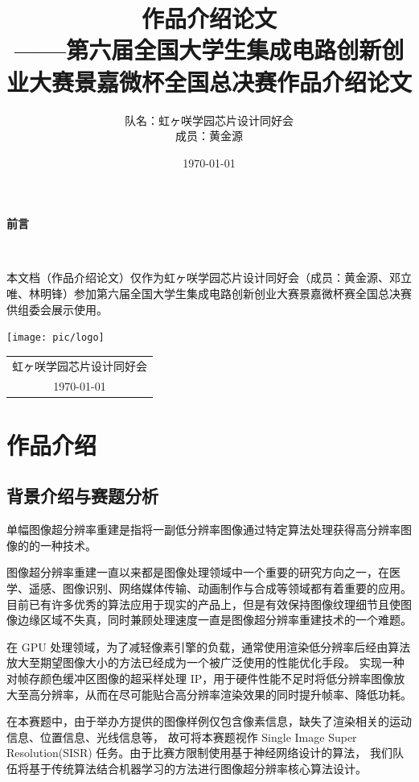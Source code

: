 \documentclass[12pt, a4paper, oneside]{ctexbook}
\title{{\Huge{\textbf{作品介绍论文}}}\normalsize{\\——第六届全国大学生集成电路创新创业大赛景嘉微杯全国总决赛作品介绍论文}}
\author{队名：虹ヶ咲学园芯片设计同好会\\ 成员：黄金源\space邓立唯\space林明锋}
\date{\today}
\begin{document}
	
	
	
	\maketitle	
	\setcounter{page}{1}
	\begin{center}
		\Huge\textbf{前言}
	\end{center}~\
	
	本文档（作品介绍论文）仅作为虹ヶ咲学园芯片设计同好会（成员：黄金源、邓立唯、林明锋）参加第六届全国大学生集成电路创新创业大赛景嘉微杯赛全国总决赛供组委会展示使用。
	~\\
	\begin{flushright}
		\texttt{[image: pic/logo]}\\
		\begin{tabular}{c}
			虹ヶ咲学园芯片设计同好会\\
			\today
		\end{tabular}
	\end{flushright}
	\newpage
	\setcounter{page}{1}
	\tableofcontents
	\newpage
	\setcounter{page}{1}
	
	\chapter{作品介绍}
	\section{背景介绍与赛题分析}
	单幅图像超分辨率重建是指将一副低分辨率图像通过特定算法处理获得高分辨率图像的的一种技术。
	
	图像超分辨率重建一直以来都是图像处理领域中一个重要的研究方向之一，在医学、遥感、图像识别、网络媒体传输、动画制作与合成等领域都有着重要的应用。
	目前已有许多优秀的算法应用于现实的产品上，但是有效保持图像纹理细节且使图像边缘区域不失真，同时兼顾处理速度一直是图像超分辨率重建技术的一个难题。
	\par 在 GPU 处理领域，为了减轻像素引擎的负载，通常使用渲染低分辨率后经由算法放大至期望图像大小的方法已经成为一个被广泛使用的性能优化手段。
	实现一种对帧存颜色缓冲区图像的超采样处理 IP，用于硬件性能不足时将低分辨率图像放大至高分辨率，从而在尽可能贴合高分辨率渲染效果的同时提升帧率、降低功耗。
	\par 在本赛题中，由于举办方提供的图像样例仅包含像素信息，缺失了渲染相关的运动信息、位置信息、光线信息等，
	故可将本赛题视作 Single Image Super Resolution(SISR) 任务。由于比赛方限制使用基于神经网络设计的算法，
	我们队伍将基于传统算法结合机器学习的方法进行图像超分辨率核心算法设计。
	
\end{document}
